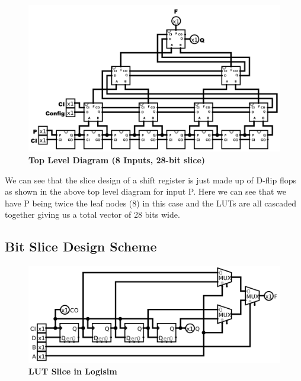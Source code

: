 \documentclass[a4paper]{article}
\begin{document}
    \begin{figure}[H]
        \centering
        \includegraphics[width=\textwidth,height=\textheight,keepaspectratio]{../../logisim/top.png}
        \caption{\textbf{Top Level Diagram (8 Inputs, 28-bit slice)}}
        \label{fig:gg}
    \end{figure}


    We can see that the slice design of a shift register is just made up of D-flip flops as shown in the above
    top level diagram for input P. Here we can see that we have P being twice the leaf nodes (8) in this case
    and the LUTs are all cascaded together giving us a total vector of 28 bits wide.

\subsection{\textbf{Bit Slice Design Scheme}}
    \begin{figure}[H]
        \centering
        \includegraphics[width=\textwidth,height=\textheight,keepaspectratio]{../../logisim/slice.png}
        \caption{\textbf{LUT Slice in Logisim}}
        \label{fig:gg}
    \end{figure}
\end{document}
